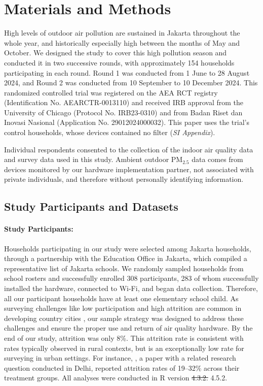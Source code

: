 \documentclass[9pt,twocolumn,twoside]{pnas-new}
\providecommand{\DIFadd}[1]{{\protect\color{red}#1}}
\providecommand{\DIFdel}[1]{{\protect\color{red}\protect\sout{#1}}}
\begin{document}
\section{Materials and Methods} \label{sec:methods}
High levels of outdoor air pollution are sustained in Jakarta throughout the whole year, and historically especially high between the months of May and October. We designed the study to cover this high pollution season and conducted it in two successive rounds, with approximately 154 households participating in each round. Round 1 was conducted from 1 June to 28 August 2024, and Round 2 was conducted from 10 September to 10 December 2024. This randomized controlled trial was registered on the AEA RCT registry (Identification No. AEARCTR-0013110) and received IRB approval from the University of Chicago (Protocol No. IRB23-0310) and from Badan Riset dan Inovasi Nasional (Application No. 29012024000032). \DIFadd{This paper uses the trial's control households, whose devices contained no filter (}\textit{\DIFadd{SI Appendix}}\DIFadd{).}

Individual respondents consented to the collection of the indoor air quality data and survey data used in this study. Ambient outdoor PM$_{2.5}$ data comes from devices monitored by our hardware implementation partner, not associated with private individuals, and therefore without personally identifying information.

\subsection{Study Participants and Datasets}
\label{ssec:methods_sampling}

\paragraph{Study Participants:} Households participating in our study were selected among Jakarta households, through a partnership with the Education Office in Jakarta, which compiled a representative list of Jakarta schools. We randomly sampled households from school rosters and successfully enrolled 308 participants, 283 of whom successfully installed the hardware, connected to Wi-Fi, and began data collection. Therefore, all our participant households have at least one elementary school child. As surveying challenges like low participation and high attrition are common in developing country cities \citep{greenstone_indoor_2021}, our sample strategy was designed to address these challenges and ensure the proper use and return of air quality hardware. By the end of our study, attrition was only 8\%. This attrition rate is consistent with rates typically observed in rural contexts, but is an exceptionally low rate for surveying in urban settings. For instance, \citep{greenstone_indoor_2021}, a paper with a related research question conducted in Delhi, reported attrition rates of 19–32\% across their treatment groups. All analyses were conducted in R version \DIFdel{4.3.2.} \DIFadd{4.5.2.}
\end{document}
